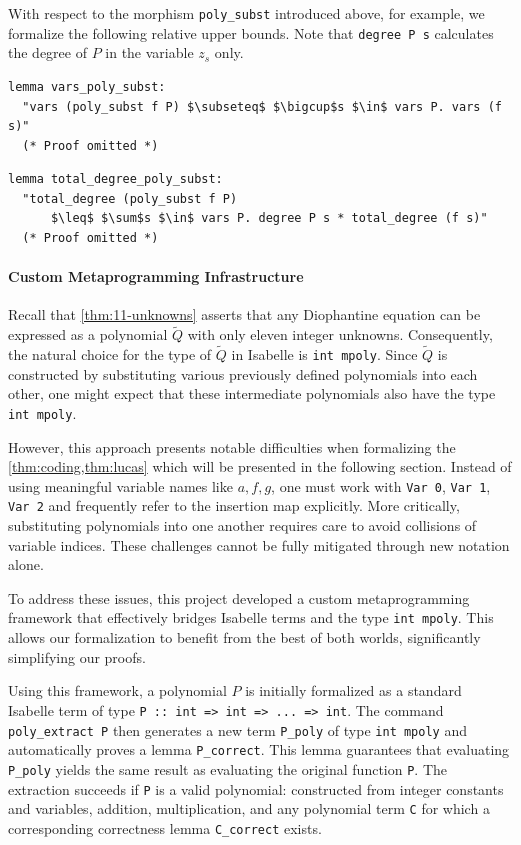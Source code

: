 \documentclass[a4paper,USenglish,cleveref,autoref,thm-restate]{lipics-v2021}
\begin{document}
With respect to the morphism \texttt{poly\_subst} introduced above, for example, we formalize the following relative upper bounds. Note that \texttt{degree P s} calculates the degree of $P$ in the variable $z_s$ only.
\begin{lstlisting}
lemma vars_poly_subst:
  "vars (poly_subst f P) $\subseteq$ $\bigcup$s $\in$ vars P. vars (f s)"
  (* Proof omitted *)
\end{lstlisting}
\begin{lstlisting}
lemma total_degree_poly_subst: 
  "total_degree (poly_subst f P) 
      $\leq$ $\sum$s $\in$ vars P. degree P s * total_degree (f s)"
  (* Proof omitted *)
\end{lstlisting}



\paragraph*{Custom Metaprogramming Infrastructure}
Recall that \cref{thm:11-unknowns} asserts that any Diophantine equation can be expressed as a polynomial $\tilde Q$ with only eleven integer unknowns. Consequently, the natural choice for the type of $\tilde Q$ in Isabelle is \texttt{int mpoly}. Since $\tilde Q$ is constructed by substituting various previously defined polynomials into each other, one might expect that these intermediate polynomials also have the type \texttt{int mpoly}.

However, this approach presents notable difficulties when formalizing the \cref{thm:coding,thm:lucas} which will be presented in the following section. Instead of using meaningful variable names like $a, f, g$, one must work with \texttt{Var 0}, \texttt{Var 1}, \texttt{Var 2} and frequently refer to the insertion map explicitly. More critically, substituting polynomials into one another requires care to avoid collisions of variable indices. These challenges cannot be fully mitigated through new notation alone.

To address these issues, this project developed a custom metaprogramming framework that effectively bridges Isabelle terms and the type \texttt{int mpoly}. This allows our formalization to benefit from the best of both worlds, significantly simplifying our proofs. 

Using this framework, a polynomial $P$ is initially formalized as a standard Isabelle term of type \lstinline{P :: int => int => ... => int}. The command \texttt{poly\_extract P}
then generates a new term \texttt{P\_poly} of type \texttt{int mpoly} and automatically proves a lemma \texttt{P\_correct}. This lemma guarantees that evaluating \texttt{P\_poly} yields the same result as evaluating the original function \texttt{P}. The extraction succeeds if \texttt{P} is a valid polynomial: constructed from integer constants and variables, addition, multiplication, and any polynomial term \texttt{C} for which a corresponding correctness lemma \texttt{C\_correct} exists.
\end{document}
